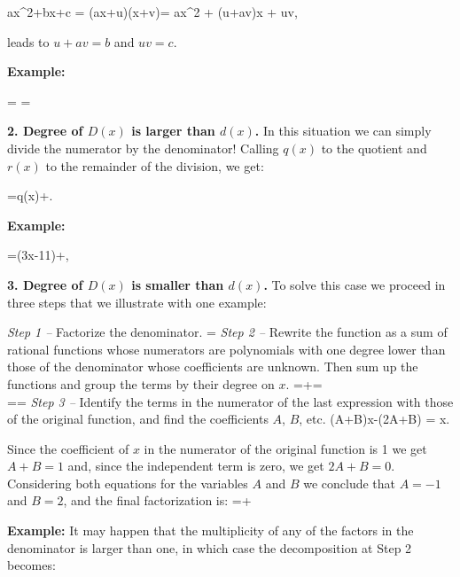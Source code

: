 \bnn ax^2+bx+c = (ax+u)(x+v)= ax^2 + (u+av)x + uv, \enn

leads to $u+av=b$ and $uv=c$. 

{\bf Example:}

\bnn
{} =  = 
\enn


{\bf 2. Degree of $D(x)$ is larger than $d(x)$. } In this situation we can simply divide the numerator
by the denominator! Calling $q(x)$ to the quotient and $r(x)$ to the remainder of the division, we get:

\bnn
	=q(x)+.
\enn

{\bf Example:}

\bnn
	=(3x-11)+,
\enn

{\bf 3. Degree of $D(x)$ is smaller than $d(x)$. } To solve this case we proceed in three steps that we illustrate with one example:

{\em Step 1 --} Factorize the denominator.
\bnn
	=
\enn
{\em Step 2 --} Rewrite the function as a sum of rational functions whose numerators are polynomials with one degree lower than those of the denominator whose coefficients are unknown. Then sum up the functions and group the terms by their degree on $x$.
\bnn
	=+=\\
	==
\enn
{\em Step 3 --} Identify the terms in the numerator of the last expression with those of the original function, and find the coefficients $A$, $B$, etc.
\bnn
	(A+B)x-(2A+B) = x.
\enn

Since the coefficient of $x$ in the numerator of the original function is 1 we get $A+B=1$ and, since the independent term is zero, we get $2A+B=0$. Considering both equations for the variables $A$ and $B$ we conclude that $A=-1$ and $B=2$, and the final factorization is:
\bnn
	=+
\enn

{\bf Example:} It may happen that the multiplicity of any of the factors in the denominator is larger than one, in which case the decomposition at Step 2 becomes:

